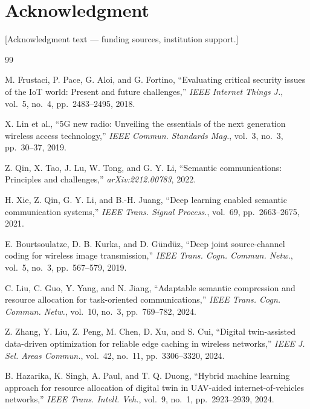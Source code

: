 \documentclass[conference]{IEEEtran}
\begin{document}
\section*{Acknowledgment}

[Acknowledgment text — funding sources, institution support.]

\begin{thebibliography}{99}

M. Frustaci, P. Pace, G. Aloi, and G. Fortino,
``Evaluating critical security issues of the IoT world: Present and
future challenges,''
\textit{IEEE Internet Things J.}, vol.~5, no.~4, pp.~2483--2495, 2018.

X. Lin et al.,
``5G new radio: Unveiling the essentials of the next generation wireless
access technology,''
\textit{IEEE Commun. Standards Mag.}, vol.~3, no.~3, pp.~30--37, 2019.

Z. Qin, X. Tao, J. Lu, W. Tong, and G. Y. Li,
``Semantic communications: Principles and challenges,''
\textit{arXiv:2212.00783}, 2022.

H. Xie, Z. Qin, G. Y. Li, and B.-H. Juang,
``Deep learning enabled semantic communication systems,''
\textit{IEEE Trans. Signal Process.}, vol.~69, pp.~2663--2675, 2021.

E. Bourtsoulatze, D. B. Kurka, and D. Gündüz,
``Deep joint source-channel coding for wireless image transmission,''
\textit{IEEE Trans. Cogn. Commun. Netw.}, vol.~5, no.~3,
pp.~567--579, 2019.

C. Liu, C. Guo, Y. Yang, and N. Jiang,
``Adaptable semantic compression and resource allocation for
task-oriented communications,''
\textit{IEEE Trans. Cogn. Commun. Netw.}, vol.~10, no.~3,
pp.~769--782, 2024.

Z. Zhang, Y. Liu, Z. Peng, M. Chen, D. Xu, and S. Cui,
``Digital twin-assisted data-driven optimization for reliable edge
caching in wireless networks,''
\textit{IEEE J. Sel. Areas Commun.}, vol.~42, no.~11,
pp.~3306--3320, 2024.

B. Hazarika, K. Singh, A. Paul, and T. Q. Duong,
``Hybrid machine learning approach for resource allocation of digital
twin in UAV-aided internet-of-vehicles networks,''
\textit{IEEE Trans. Intell. Veh.}, vol.~9, no.~1, pp.~2923--2939, 2024.


\end{thebibliography}
\end{document}
